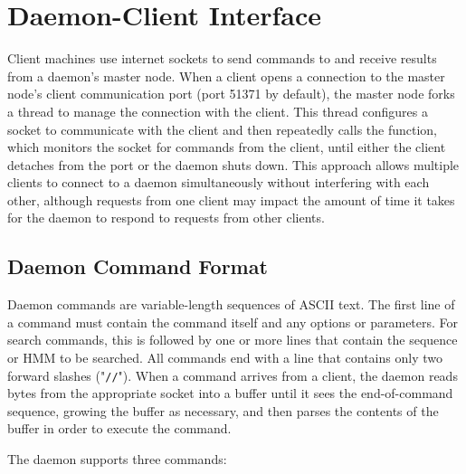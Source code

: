 \documentclass[notoc,justified]{tufte-book}    %
\begin{document}
\chapter{Daemon-Client Interface}
Client machines use internet sockets to send commands to and receive results from a daemon's master node.  When a client opens a connection to the master node's client communication port (port 51371 by default), the master node forks a thread to manage the connection with the client.  This thread configures a socket to communicate with the client and then repeatedly calls the  function, which monitors the socket for commands from the client, until either the client detaches from the port or the daemon shuts down.  This approach allows multiple clients to connect to a daemon simultaneously without interfering with each other, although requests from one client may impact the amount of time it takes for the daemon to respond to requests from other clients.


\section{Daemon Command Format}
Daemon commands are variable-length sequences of ASCII text.  The first line of a command must contain the command itself and any options or parameters.  For search commands, this is followed by one or more lines that contain the sequence or HMM to be searched.  All commands end with a line that contains only two forward slashes ("{\tt //}").  When a command arrives from a client, the daemon reads bytes from the appropriate socket into a buffer until it sees the end-of-command sequence, growing the buffer as necessary, and then parses the contents of the buffer in order to execute the command.   

The daemon supports three commands:
\end{document}
